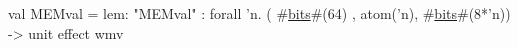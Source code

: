 val MEMval = {lem: "MEMval"} : forall 'n.
  ( #\hyperref[zbits]{bits}#(64) , atom('n), #\hyperref[zbits]{bits}#(8*'n)) -> unit effect { wmv }

